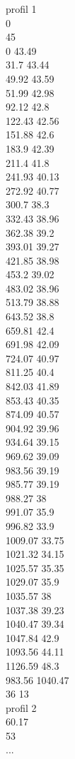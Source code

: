 \documentclass[a4paper,12pt]{article}
\begin{document}
profil 1\\	
0	\\
45	\\
0	          43.49\\
31.7	      43.44\\
49.92	      43.59\\
51.99	      42.98\\
92.12	      42.8\\
122.43      42.56\\
151.88      42.6\\
183.9	      42.39\\
211.4	      41.8\\
241.93      40.13\\
272.92      40.77\\
300.7	      38.3\\
332.43      38.96\\
362.38      39.2\\
393.01      39.27\\
421.85      38.98\\
453.2	      39.02\\
483.02	38.96\\
513.79	38.88\\
643.52	38.8\\
659.81	42.4\\
691.98	42.09\\
724.07	40.97\\
811.25	40.4\\
842.03	41.89\\
853.43	40.35\\
874.09	40.57\\
904.92	39.96\\
934.64	39.15\\
969.62	39.09\\
983.56	39.19\\
985.77	39.19\\
988.27	38\\
991.07	35.9\\
996.82	33.9\\
1009.07	33.75\\
1021.32	34.15\\
1025.57	35.35\\
1029.07	35.9\\
1035.57	38\\
1037.38	39.23\\
1040.47	39.34\\
1047.84	42.9\\
1093.56	44.11\\
1126.59	48.3\\
983.56	1040.47\\
36	 13\\
profil 2	\\
60.17	\\
53\\
...\\
\end{document}
